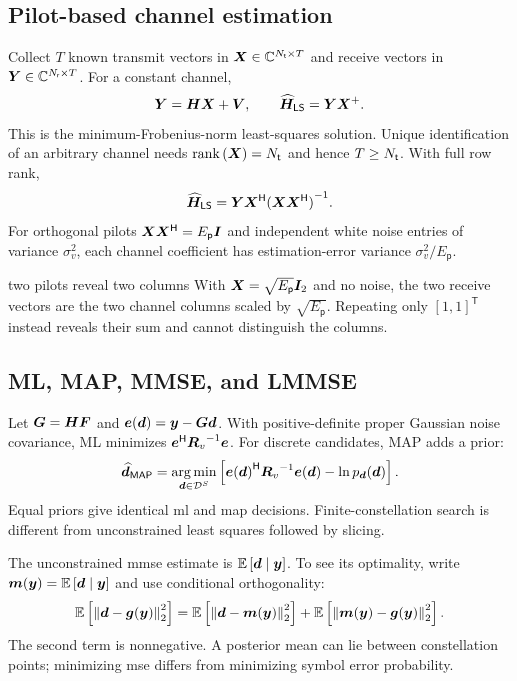 \subsection{Pilot-based channel estimation}
Collect $T$ known transmit vectors in $\bm{X}\in\mathbb{C}^{N_{\mathsf{t}}\times T}$ and receive vectors in $\bm{Y}\in\mathbb{C}^{N_{\mathsf{r}}\times T}$. For a constant channel,
\begin{equation}
\bm{Y}=\bm{H}\bm{X}+\bm{V},\qquad
\widehat{\bm{H}}_{\mathsf{LS}}=\bm{Y}{\bm{X}}^{+}.
\end{equation}
This is the minimum-Frobenius-norm least-squares solution. Unique identification of an arbitrary channel needs $\operatorname{rank}\left(\bm{X}\right)=N_{\mathsf{t}}$ and hence $T\geq N_{\mathsf{t}}$. With full row rank,
\begin{equation}
\widehat{\bm{H}}_{\mathsf{LS}}=\bm{Y}{\bm{X}}^{\mathsf{H}}{(\bm{X}{\bm{X}}^{\mathsf{H}})}^{-1}.
\end{equation}
For orthogonal pilots $\bm{X}{\bm{X}}^{\mathsf{H}}=E_{\mathsf p}\bm{I}$ and independent white noise entries of variance $\sigma_v^2$, each channel coefficient has estimation-error variance $\sigma_v^2/E_{\mathsf p}$.

\begin{example}{two pilots reveal two columns}
With $\bm{X}=\sqrt{E_{\mathsf p}}\bm{I}_2$ and no noise, the two receive vectors are the two channel columns scaled by $\sqrt{E_{\mathsf p}}$. Repeating only $[1,1]^{\mathsf T}$ instead reveals their sum and cannot distinguish the columns.
\end{example}

\subsection{ML, MAP, MMSE, and LMMSE}
Let $\bm{G}=\bm{H}\bm{F}$ and $\bm{e}(\bm{d})=\bm{y}-\bm{G}\bm{d}$. With positive-definite proper Gaussian noise covariance, ML minimizes ${\bm{e}}^{\mathsf{H}}{\bm{R}_v}^{-1}\bm{e}$. For discrete candidates, MAP adds a prior:
\begin{equation}
\widehat{\bm{d}}_{\mathsf{MAP}}=\operatorname*{arg\,min}_{\bm{d}\in\mathcal{D}^{S}}
\left[{\bm{e}(\bm{d})}^{\mathsf{H}}{\bm{R}_v}^{-1}\bm{e}(\bm{d})-\ln p_{\bm{d}}(\bm{d})\right].
\end{equation}
Equal priors give identical \ac{ml} and \ac{map} decisions. Finite-constellation search is different from unconstrained least squares followed by slicing.

The unconstrained \ac{mmse} estimate is $\mathbb{E}\left[\bm{d}\mid\bm{y}\right]$. To see its optimality, write $\bm{m}(\bm{y})=\mathbb{E}\left[\bm{d}\mid\bm{y}\right]$ and use conditional orthogonality:
\begin{equation}
\mathbb{E}\left[\left\|\bm{d}-\bm{g}(\bm{y})\right\|_2^2\right]
=\mathbb{E}\left[\left\|\bm{d}-\bm{m}(\bm{y})\right\|_2^2\right]
+\mathbb{E}\left[\left\|\bm{m}(\bm{y})-\bm{g}(\bm{y})\right\|_2^2\right].
\end{equation}
The second term is nonnegative. A posterior mean can lie between constellation points; minimizing \ac{mse} differs from minimizing symbol error probability.

